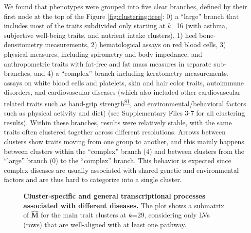 \documentclass[
  a4paper,
]{article}
\begin{document}
We found that phenotypes were grouped into five clear branches, defined by their first node at the top of the Figure \ref{fig:clustering:tree}:
0) a ``large'' branch that includes most of the traits subdivided only starting at \(k\)=16 (with asthma, subjective well-being traits, and nutrient intake clusters),
1) heel bone-densitometry measurements,
2) hematological assays on red blood cells,
3) physical measures, including spirometry and body impedance, and anthropometric traits with fat-free and fat mass measures in separate sub-branches, and
4) a ``complex'' branch including keratometry measurements, assays on white blood cells and platelets, skin and hair color traits, autoimmune disorders, and cardiovascular diseases (which also included other cardiovascular-related traits such as hand-grip strength\textsuperscript{\protect\hyperlink{ref-aBVh8zt1}{81}}, and environmental/behavioral factors such as physical activity and diet) (see Supplementary Files 3-7 for all clustering results).
Within these branches, results were relatively stable, with the same traits often clustered together across different resolutions.
Arrows between clusters show traits moving from one group to another, and this mainly happens between clusters within the ``complex'' branch (4) and between clusters from the ``large'' branch (0) to the ``complex'' branch.
This behavior is expected since complex diseases are usually associated with shared genetic and environmental factors and are thus hard to categorize into a single cluster.

\begin{figure}
\hypertarget{fig:clustering:heatmap}{%
\centering

\caption{\textbf{Cluster-specific and general transcriptional processes associated with different diseases.}
The plot shows a submatrix of \(\hat{\mathbf{M}}\) for the main trait clusters at \(k\)=29, considering only LVs (rows) that are well-aligned with at least one pathway.}\label{fig:clustering:heatmap}
}
\end{figure}
\end{document}
